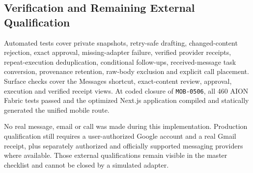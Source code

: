 \subsection{Verification and Remaining External Qualification}

Automated tests cover private snapshots, retry-safe drafting, changed-content rejection, exact
approval, missing-adapter failure, verified provider receipts, repeat-execution deduplication,
conditional follow-ups, received-message task conversion, provenance retention, raw-body exclusion
and explicit call placement.  Surface checks cover the Messages shortcut, exact-content review,
approval, execution and verified receipt views.  At coded closure of \texttt{MOB-0506}, all 460
AION Fabric tests passed and the optimized Next.js application compiled and statically generated
the unified mobile route.

No real message, email or call was made during this implementation.  Production qualification still
requires a user-authorized Google account and a real Gmail receipt, plus separately authorized and
officially supported messaging providers where available.  Those external qualifications remain
visible in the master checklist and cannot be closed by a simulated adapter.
